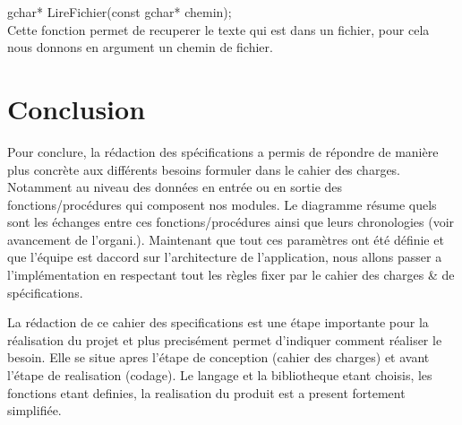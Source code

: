 \documentclass[a4]{article}
\begin{document}
	gchar* LireFichier(const gchar* chemin);\\
		Cette fonction permet de recuperer le texte qui est dans un fichier, pour cela nous donnons en argument un chemin de fichier.\\
	
	\section{Conclusion}
	
	Pour conclure, la rédaction des spécifications a permis de répondre de manière plus concrète aux différents besoins
	formuler dans le cahier des charges. Notamment au niveau des données en entrée ou en sortie des fonctions/procédures
	qui composent nos modules. Le diagramme résume quels sont les échanges entre ces fonctions/procédures ainsi que
	leurs chronologies (voir avancement de l'organi.).
	Maintenant que tout ces paramètres ont été définie et que l'équipe est daccord sur l'architecture de l'application, nous allons
	passer a l'implémentation en respectant tout les règles fixer par le cahier des charges & de spécifications.
	
	La rédaction de ce cahier des specifications est une étape importante pour la réalisation du projet
	et plus precisément permet d'indiquer comment réaliser le besoin.
	Elle se situe apres l'étape de conception
	(cahier des charges) et avant l'étape de realisation (codage). Le langage et la bibliotheque etant choisis,
	les fonctions etant definies, la realisation du produit est a present fortement simplifiée. 
	
	
\end{document}
